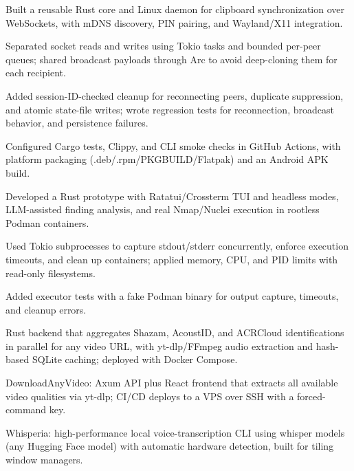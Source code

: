 \begin{cvbullets}
  \item Built a reusable Rust core and Linux daemon for clipboard synchronization over WebSockets, with mDNS discovery, PIN pairing, and Wayland/X11 integration.
  \item Separated socket reads and writes using Tokio tasks and bounded per-peer queues; shared broadcast payloads through Arc to avoid deep-cloning them for each recipient.
  \item Added session-ID-checked cleanup for reconnecting peers, duplicate suppression, and atomic state-file writes; wrote regression tests for reconnection, broadcast behavior, and persistence failures.
  \item Configured Cargo tests, Clippy, and CLI smoke checks in GitHub Actions, with platform packaging (.deb/.rpm/PKGBUILD/Flatpak) and an Android APK build.
\end{cvbullets}

\begin{cvbullets}
  \item Developed a Rust prototype with Ratatui/Crossterm TUI and headless modes, LLM-assisted finding analysis, and real Nmap/Nuclei execution in rootless Podman containers.
  \item Used Tokio subprocesses to capture stdout/stderr concurrently, enforce execution timeouts, and clean up containers; applied memory, CPU, and PID limits with read-only filesystems.
  \item Added executor tests with a fake Podman binary for output capture, timeouts, and cleanup errors.
\end{cvbullets}

\begin{cvbullets}
  \item Rust backend that aggregates Shazam, AcoustID, and ACRCloud identifications in parallel for any video URL, with yt-dlp/FFmpeg audio extraction and hash-based SQLite caching; deployed with Docker Compose.
\end{cvbullets}

\begin{cvbullets}
  \item DownloadAnyVideo: Axum API plus React frontend that extracts all available video qualities via yt-dlp; CI/CD deploys to a VPS over SSH with a forced-command key.
  \item Whisperia: high-performance local voice-transcription CLI using whisper models (any Hugging Face model) with automatic hardware detection, built for tiling window managers.
\end{cvbullets}

